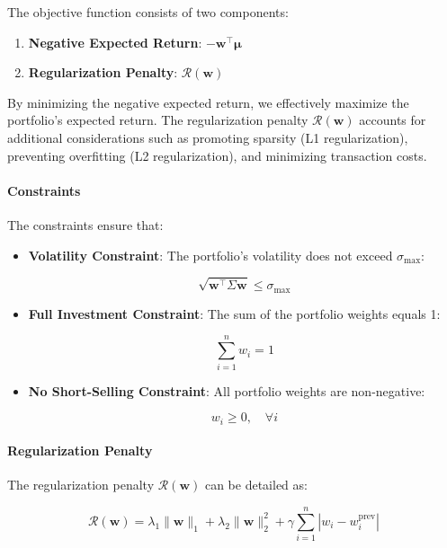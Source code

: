 The objective function consists of two components:

\begin{enumerate}
    \item \textbf{Negative Expected Return}: \( -\mathbf{w}^\top \boldsymbol{\mu} \)
    \item \textbf{Regularization Penalty}: \( \mathcal{R}(\mathbf{w}) \)
\end{enumerate}

By minimizing the negative expected return, we effectively maximize the portfolio's expected return. The regularization penalty \( \mathcal{R}(\mathbf{w}) \) accounts for additional considerations such as promoting sparsity (L1 regularization), preventing overfitting (L2 regularization), and minimizing transaction costs.

\paragraph{Constraints}

The constraints ensure that:

\begin{itemize}
    \item \textbf{Volatility Constraint}: The portfolio's volatility does not exceed \( \sigma_{\text{max}} \):

    \[
    \sqrt{\mathbf{w}^\top \Sigma \mathbf{w}} \leq \sigma_{\text{max}}
    \]

    \item \textbf{Full Investment Constraint}: The sum of the portfolio weights equals 1:

    \[
    \sum_{i=1}^n w_i = 1
    \]

    \item \textbf{No Short-Selling Constraint}: All portfolio weights are non-negative:

    \[
    w_i \geq 0, \quad \forall i
    \]
\end{itemize}

\paragraph{Regularization Penalty}

The regularization penalty \( \mathcal{R}(\mathbf{w}) \) can be detailed as:

\[
\mathcal{R}(\mathbf{w}) = \lambda_1 \|\mathbf{w}\|_1 + \lambda_2 \|\mathbf{w}\|_2^2 + \gamma \sum_{i=1}^n |w_i - w_i^{\text{prev}}|
\]

